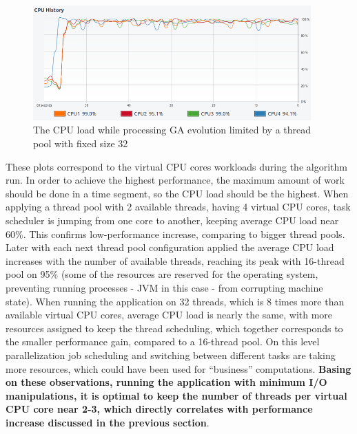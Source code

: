 \begin{figure}[H]
\centering\includegraphics[width=0.95\textwidth]{img/exp/2/limit-threadpool-32}
\caption{The CPU load while processing GA evolution limited by a thread pool with fixed size 32 }  \label{img:cpu-thread-32}
\end{figure}

These plots correspond to the virtual CPU cores workloads during the algorithm run. In order to achieve the highest performance, the maximum amount of work should be done in a time segment, so the CPU load should be the highest. When applying a  thread pool with 2 available threads, having 4 virtual CPU cores, task scheduler is jumping from one core to another, keeping average CPU load near 60\%. This confirms low-performance increase, comparing to bigger thread pools. Later with each next thread pool configuration applied the average CPU load increases with the number of available threads, reaching its peak with 16-thread pool on 95\% (some of the resources are reserved for the operating system, preventing running processes - JVM in this case - from corrupting machine state). When running the application on 32 threads, which is 8 times more than available virtual CPU cores, average CPU load is nearly the same, with more resources assigned to keep the thread scheduling, which together corresponds to the smaller performance gain, compared to a 16-thread pool. On this level parallelization job scheduling and switching between different tasks are taking more resources, which could have been used for ``business'' computations. \textbf{Basing on these observations, running the application with minimum I/O manipulations, it is optimal to keep the number of threads per virtual CPU core near 2-3, which directly correlates with performance increase discussed in the previous section}.

